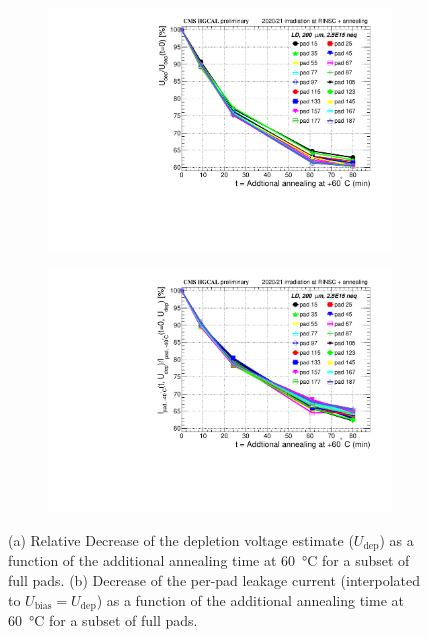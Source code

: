 \begin{figure}
	\captionsetup[subfigure]{aboveskip=-1pt,belowskip=-1pt}
	\centering
	\begin{subfigure}[b]{0.49\textwidth}
		\includegraphics[width=0.999\textwidth]{plots/annealing_Vdep/annealing_Vdep.pdf}
		\subcaption{
		}
		\label{plot:annealing_CV}
	\end{subfigure}
	\hfill
	\begin{subfigure}[b]{0.49\textwidth}
		\includegraphics[width=0.999\textwidth]{plots/annealing_iv/annealing_current_atUdep.pdf}
		\subcaption{
		}
		\label{plot:annealing_Vdep}
	\end{subfigure}
	\caption{
		(a) Relative Decrease of the depletion voltage estimate ($U_\text{dep}$) as a function of the additional annealing time at \SI{60}{\celsius} for a subset of full pads.
        (b) Decrease of the per-pad leakage current (interpolated to $U_\text{bias}=U_\text{dep}$) as a function of the additional annealing time at \SI{60}{\celsius} for a subset of full pads.
	}
\end{figure}
